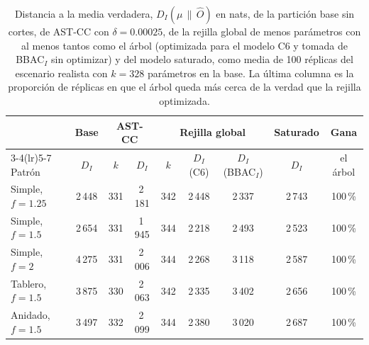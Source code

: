 \begin{table}[t]
\centering
\small
\begin{tabular}{@{}lcccccccc@{}}
\toprule
 & Base & \multicolumn{2}{c}{AST-CC} & \multicolumn{3}{c}{Rejilla global} & Saturado & Gana \\
\cmidrule(lr){3-4}\cmidrule(lr){5-7}
Patrón & $D_I$ & $k$ & $D_I$ & $k$ & $D_I$ (C6) & $D_I$ (BBAC$_I$) & $D_I$ & el árbol \\
\midrule
Simple, $f = 1.25$ & 2\,448 & 331 & 2\,181 & 342 & 2\,448 & 2\,337 & 2\,743 & 100\,\% \\
Simple, $f = 1.5$  & 2\,654 & 331 & 1\,945 & 344 & 2\,218 & 2\,493 & 2\,523 & 100\,\% \\
Simple, $f = 2$    & 4\,275 & 331 & 2\,006 & 344 & 2\,268 & 3\,118 & 2\,587 & 100\,\% \\
Tablero, $f = 1.5$ & 3\,875 & 330 & 2\,063 & 342 & 2\,335 & 3\,402 & 2\,656 & 100\,\% \\
Anidado, $f = 1.5$ & 3\,497 & 332 & 2\,099 & 344 & 2\,380 & 3\,020 & 2\,687 & 100\,\% \\
\bottomrule
\end{tabular}
\caption{Distancia a la media verdadera, $D_I(\mu \,\|\, \hat O)$ en nats, de la
partición base sin cortes, de AST-CC con $\delta = 0.00025$, de la rejilla global
de menos parámetros con al menos tantos como el árbol (optimizada para el modelo
C6 y tomada de BBAC$_I$ sin optimizar) y del modelo saturado, como media de 100
réplicas del escenario realista con $k = 328$ parámetros en la base. La última
columna es la proporción de réplicas en que el árbol queda más cerca de la verdad
que la rejilla optimizada.}
\label{tab:res-rejillas-sinteticos}
\end{table}

